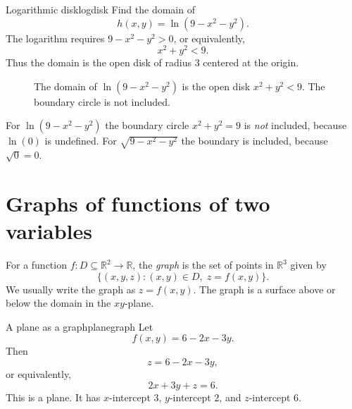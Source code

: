 \documentclass[11pt]{article}
\newcommand{\R}{\mathbb R}
\begin{document}
\begin{workedexample}{Logarithmic disk}{logdisk}
Find the domain of
\[
h(x,y)=\ln(9-x^2-y^2).
\]
The logarithm requires $9-x^2-y^2>0$, or equivalently,
\[
x^2+y^2<9.
\]
Thus the domain is the open disk of radius $3$ centered at the origin.
\end{workedexample}

\begin{figure}[H]
\centering
{}
\caption{The domain of $\ln(9-x^2-y^2)$ is the open disk $x^2+y^2<9$. The boundary circle is not included.}
\end{figure}

\begin{warningbox}
For $\ln(9-x^2-y^2)$ the boundary circle $x^2+y^2=9$ is \emph{not} included, because $\ln(0)$ is undefined. For $\sqrt{9-x^2-y^2}$ the boundary is included, because $\sqrt{0}=0$.
\end{warningbox}

\section{Graphs of functions of two variables}

For a function $f:D\subseteq\R^2\to\R$, the \emph{graph} is the set of points in $\R^3$ given by
\[
\{(x,y,z):(x,y)\in D,\; z=f(x,y)\}.
\]
We usually write the graph as $z=f(x,y)$. The graph is a surface above or below the domain in the $xy$-plane.

\begin{workedexample}{A plane as a graph}{planegraph}
Let
\[
f(x,y)=6-2x-3y.
\]
Then
\[
z=6-2x-3y,
\]
or equivalently,
\[
2x+3y+z=6.
\]
This is a plane. It has $x$-intercept $3$, $y$-intercept $2$, and $z$-intercept $6$.
\end{workedexample}
\end{document}
